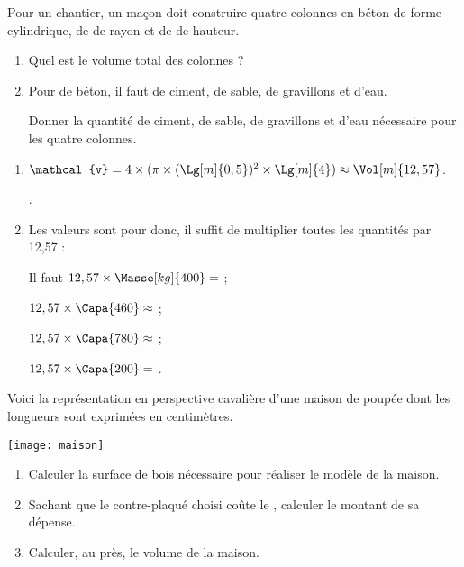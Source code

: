 \begin{Maquette}[Fiche,CorrigeFin,Colonnes=2]{}
\begin{multicols}{2}
         
         \begin{exercice} %
            Pour un chantier, un maçon doit construire quatre colonnes en béton de forme cylindrique, de  de rayon et de  de hauteur.
            \begin{enumerate}
               \item Quel est le volume total des colonnes ?
               \item Pour  de béton, il faut  de ciment,  de sable,  de gravillons et  d'eau. \par
                  Donner la quantité de ciment, de sable, de gravillons et d'eau nécessaire pour les quatre colonnes.
            \end{enumerate}
         \end{exercice}
         
         \begin{Solution}
            \begin{enumerate}
               \item $\mathcal{v} =4\times(\pi\times(\Lg[m]{0,5})^2\times\Lg[m]{4}) \approx \Vol[m]{12,57}$. \par
                  .
               \item Les valeurs sont pour  donc, il suffit de multiplier toutes les quantités par 12,57 : \par
                  Il faut $12,57\times\Masse[kg]{400} =$  ; \par
                  $12,57\times\Capa{460} \approx$  ; \par
                  $12,57\times\Capa{780} \approx$  ; \par
                  $12,57\times\Capa{200} =$ .
            \end{enumerate}
         \end{Solution}
         
         
         \begin{exercice}[Dur] %
            Voici la représentation en perspective cavalière d'une maison de poupée dont les longueurs sont exprimées en centimètres.
            \begin{center}
               \texttt{[image: maison]}
            \end{center}
            \begin{enumerate}
               \item Calculer la surface de bois nécessaire pour réaliser le modèle de la maison.
               \item Sachant que le contre-plaqué choisi coûte  le \Aire[m]{}, calculer le montant de sa dépense.
               \item Calculer, au \Vol[dm]{} près, le volume de la maison.
            \end{enumerate}
         \end{exercice}
         

\end{multicols}
\end{Maquette}
